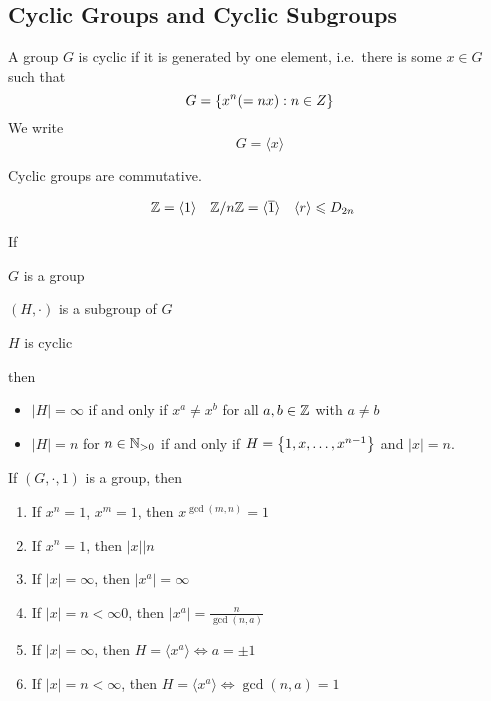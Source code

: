 \documentclass[a5paper]{article}
\begin{document}
\subsection{Cyclic Groups and Cyclic Subgroups}

\begin{definition}
  A group $G$ is cyclic if it is generated by one element, i.e.\
	there is some $x\in G$ such that
  \begin{equation*}
    G=\left\{x^n(=nx):n\in Z\right\}
  \end{equation*}
  We write
  \begin{equation*}
    G=\langle x \rangle
  \end{equation*}
\end{definition}

\begin{lemma}
	Cyclic groups are commutative.
\end{lemma}

\begin{example}
	\begin{align*}
    \mathbb{Z} = \langle 1 \rangle 
    &&\mathbb{Z}/n\mathbb{Z} = \langle \overline{1} \rangle 
    &&&\langle r \rangle \leqslant D_{2n}
  \end{align*}
\end{example}

\begin{lemma}
  If
  \begin{premises}
    \item $G$ is a group
    \item $(H,\cdot)$ is a subgroup of $G$
    \item $H$ is cyclic
  \end{premises}
  then
  \begin{conclusion}
    \begin{itemize}
      \item $|H|=\infty$ if and only if $x^a\neq x^b$ for all $a,b\in\mathbb{Z}$ with
        $a\neq b$
      \item $|H|=n$ for $n\in\mathbb{N}_{>0}$ if and only if
        $H=\left\{1,x,\ldots,x^{n-1}\right\}$ and $|x|=n$.
    \end{itemize}
  \end{conclusion}
\end{lemma}

\begin{lemma}
	If $(G,\cdot,1)$ is a group, then
  \begin{enumerate}%
    \item If $x^n=1$, $x^m=1$, then $x^{\gcd(m,n)}=1$
    \item If $x^n=1$, then $|x|\big|n$
    \item If $|x|=\infty$, then $|x^a|=\infty$
    \item If $|x|=n<\infty0$, then $|x^a|=\frac{n}{\gcd(n,a)}$
    \item If $|x|=\infty$, then $H=\langle x^a \rangle\iff a=\pm 1$
    \item If $|x|=n<\infty$, then $H=\langle x^a \rangle\iff\gcd(n,a)=1$
  \end{enumerate}
\end{lemma}
\end{document}
